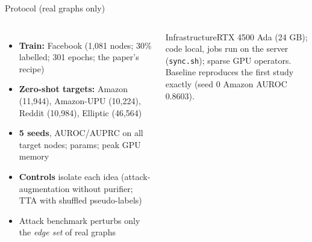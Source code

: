 \documentclass[aspectratio=169,11pt]{beamer}
\begin{document}
\begin{frame}{Protocol (real graphs only)}
\begin{columns}[T]
\begin{itemize}\small
\item \textbf{Train:} Facebook (1,081 nodes; 30\% labelled; 301 epochs; the paper's recipe)
\item \textbf{Zero-shot targets:} Amazon (11,944), Amazon-UPU (10,224), Reddit (10,984), Elliptic (46,564)
\item \textbf{5 seeds}, AUROC/AUPRC on all target nodes; params; peak GPU memory
\item \textbf{Controls} isolate each idea (attack-augmentation without purifier; TTA with shuffled pseudo-labels)
\item Attack benchmark perturbs only the \emph{edge set} of real graphs
\end{itemize}
\begin{block}{Infrastructure}\small RTX 4500 Ada (24 GB); code local, jobs run on the server (\texttt{sync.sh}); sparse GPU operators.\\
Baseline reproduces the first study exactly (seed 0 Amazon AUROC 0.8603).\end{block}
\end{columns}
\end{frame}
\end{document}
